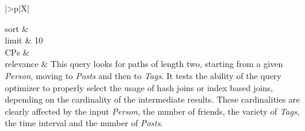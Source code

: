 \begin{tabularx}{\queryCardWidth}{|>{\queryPropertyCell}p{\queryPropertyCellWidth}|X|}
%
	
		sort		&
		\innerCardVSpace \\ \hline
	limit & 10 \\ \hline
	CPs &
	 \\ \hline
	relevance &
		\footnotesize This query looks for paths of length two, starting from a given
\emph{Person}, moving to \emph{Posts} and then to \emph{Tags}. It tests
the ability of the query optimizer to properly select the usage of hash
joins or index based joins, depending on the cardinality of the
intermediate results. These cardinalities are clearly affected by the
input \emph{Person}, the number of friends, the variety of \emph{Tags},
the time interval and the number of \emph{Posts}.
 \\ \hline%
\end{tabularx}
\queryCardVSpace

\let\emph\oldemph